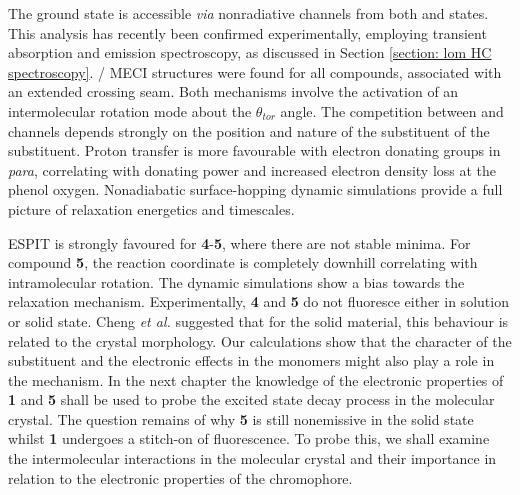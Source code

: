 The ground state is accessible \textit{via} nonradiative channels from both \Estar{} and \Kstar{} states. This analysis has recently been confirmed experimentally,  employing transient absorption and emission spectroscopy, as discussed in Section \ref{section: lom HC spectroscopy}.\cite{Song2018,Zahid2017} \sone/\szero{} MECI structures were found for all compounds, associated with an extended crossing seam. Both mechanisms involve the activation of an intermolecular rotation mode about the $\theta_{tor}$ angle. The competition between \Estar{} and \Kstar{} channels depends strongly on the position and nature of the substituent of the substituent. Proton transfer is more favourable with electron donating groups in \textit{para}, correlating with donating power and increased electron density loss at the phenol oxygen. Nonadiabatic surface-hopping dynamic simulations provide a full picture of relaxation energetics and timescales. 

ESPIT is strongly favoured for \textbf{4}-\textbf{5}, where there are not stable \Estar{} minima. For compound \textbf{5}, the reaction coordinate is completely downhill correlating with intramolecular rotation. The dynamic simulations show a bias towards the \Kstar{} relaxation mechanism. Experimentally, \textbf{4} and \textbf{5} do not fluoresce either in solution or solid state. Cheng \textit{et al.} suggested that for the solid material, this behaviour is related to the crystal morphology.\cite{Cheng2015} Our calculations show that the character of the substituent and the electronic effects in the monomers might also play a role in the mechanism. In the next chapter the knowledge of the electronic properties of \textbf{1} and \textbf{5} shall be used to probe the excited state decay process in the molecular crystal. The question remains of why \textbf{5} is still nonemissive in the solid state whilst \textbf{1} undergoes a stitch-on of fluorescence. To probe this, we shall examine the intermolecular interactions in the molecular crystal and their importance in relation to the electronic properties of the chromophore. 




